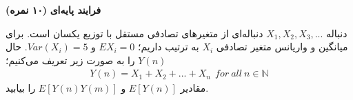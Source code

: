 \Large \textbf{فرایند پایه‌ای}
\large \textbf{(۱۰ نمره)}

\normalsize \vspace{0.5cm}

 دنباله 
 $X_\text{1},X_\text{2},X_\text{3},...$ دنباله‌ای از متغیرهای تصادفی مستقل با توزیع یکسان است.
 برای میانگین و واریانس متغیر تصادفی 
 $X_i$ به ترتیب داریم؛
 $EX_i=\text{0}$ و 
 $Var(X_i)=\text{5}$. حال 
 $Y(n)$ را به صورت زیر تعریف می‌کنیم؛
 \begin{gather*}
     Y(n)=X_\text{1}+X_\text{2}+...+X_n  \ \ for\ all\ n \in \mathbb{N}
 \end{gather*}
 مقادیر 
 $E[Y(n)]$ 
 و 
 $E[Y(n)Y(m)]$ را بیابید.
